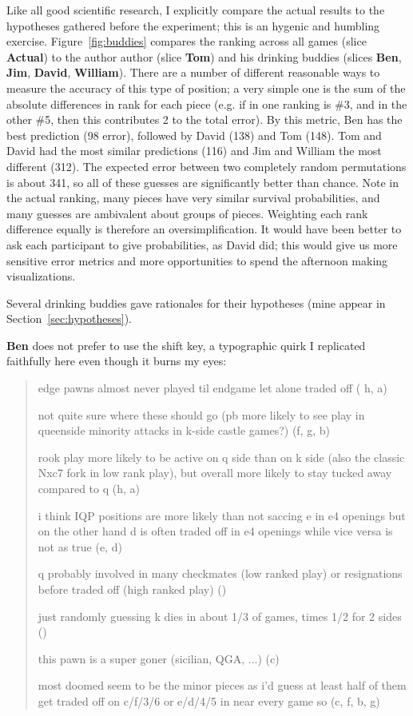\documentclass[twocolumn]{article}
\begin{document}
Like all good scientific research, I explicitly compare the actual
results to the hypotheses gathered before the experiment; this is an
hygenic and humbling exercise. Figure~\ref{fig:buddies} compares the
ranking across all games (slice {\bf Actual}) to the author author
(slice {\bf Tom}) and his drinking buddies (slices {\bf Ben}, {\bf
  Jim}, {\bf David}, {\bf William}). There are a number of different
reasonable ways to measure the accuracy of this type of position; a
very simple one is the sum of the absolute differences in rank for
each piece (e.g. if in one ranking \king is \#3, and in the other \#5,
then this contributes 2 to the total error). By this metric, Ben has
the best prediction (98 error), followed by David (138) and Tom (148).
Tom and David had the most similar predictions (116) and Jim and
William the most different (312). The expected error between two
completely random permutations is about 341, so all of these guesses
are significantly better than chance. Note in the actual ranking, many
pieces have very similar survival probabilities, and many guesses are
ambivalent about groups of pieces. Weighting each rank difference
equally is therefore an oversimplification. It would have been better
to ask each participant to give probabilities, as David did; this
would give us more sensitive error metrics and more opportunities to
spend the afternoon making visualizations.

Several drinking buddies gave rationales for their hypotheses (mine
appear in Section~\ref{sec:hypotheses}).

\medskip
{\bf Ben} does not prefer to use the shift key, a typographic quirk I
replicated faithfully here even though it burns my eyes:

\begin{quote}
edge pawns almost never played til endgame let alone traded off (\pawn
h, \pawn a)

not quite sure where these should go (pb more likely to see play in
queenside minority attacks in k-side castle games?) (\pawn f, \pawn g, \pawn b)

rook play more likely to be active on q side than on k side (also the
classic Nxc7 fork in low rank play), but overall more likely to stay
tucked away compared to q (\rook h, \rook a)

i think IQP positions are more likely than not saccing e in e4 openings
but on the other hand d is often traded off in e4 openings while vice
versa is not as true (\pawn e, \pawn d)

q probably involved in many checkmates (low ranked play) or resignations
before traded off (high ranked play) (\queen)

just randomly guessing k dies in about 1/3 of games, times 1/2 for 2
sides (\king)

this pawn is a super goner (sicilian, QGA, ...) (\pawn c)

most doomed seem to be the minor pieces as i'd guess at least half of
them get traded off on c/f/3/6 or e/d/4/5 in near every game so (\bishop c, \bishop f, \knight b, \knight g)
\end{quote}
\end{document}
